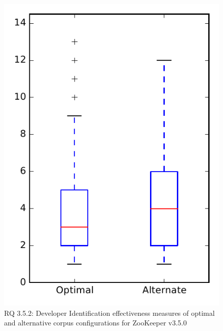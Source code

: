 
\begin{figure}
\centering
\includegraphics[height=0.4\textheight]{figures/combo/dit_rq2_zookeeper}
\caption{RQ 3.5.2: Developer Identification effectiveness measures of optimal and alternative corpus configurations for ZooKeeper v3.5.0}
\label{fig:combo:dit:rq2:zookeeper}
\end{figure}
